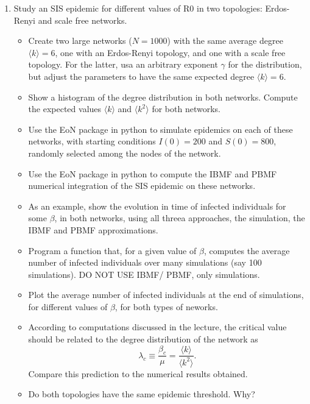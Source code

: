 \begin{enumerate}
 \item Study an SIS epidemic for different values of R0 in two topologies: Erdos-Renyi and scale free networks.
\begin{itemize}
 \item Create two large networks ($N=1000$) with the same average degree $\langle k \rangle = 6$, one with an Erdos-Renyi topology, and one with a scale free topology. For the latter, usa an arbitrary exponent $\gamma$ for the distribution, but 
 adjust the parameters to have the same expected degree $\langle k \rangle = 6$.
 \item Show a histogram of the degree distribution in both networks. Compute the expected values $\langle k \rangle$ and $\langle k^2 \rangle$ for both networks.
 \item Use the EoN package in python to simulate epidemics on each of these networks, with starting conditions $I(0)=200$ and $S(0)=800$, randomly selected among the nodes of the network.
 \item Use the EoN package in python to compute the IBMF and PBMF numerical integration of the SIS epidemic on these networks. 
 \item As an example, show the evolution in time of infected individuals for some $\beta$, in both networks, using all threea approaches, the simulation, the IBMF and PBMF approximations.

\item Program a function that, for a given value of $\beta$, computes the average number of infected individuals over many simulations (say 100 simulations). DO NOT USE IBMF/ PBMF, only simulations.

\item Plot the average number of infected individuals at the end of simulations, for different values of $\beta$, for both types of neworks.

\item According to computations discussed in the lecture, the critical value should be related to the degree distribution of the network as 
\[\lambda_c \equiv \frac{\beta_c }{ \mu} = \frac{\langle k \rangle}{\langle k^2 \rangle }.\]
Compare this prediction to the numerical results obtained.

\item Do both topologies have the same epidemic threshold. Why? 
\end{itemize}
\end{enumerate}

